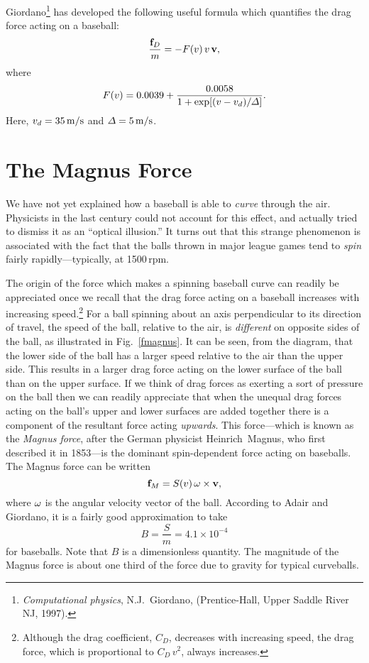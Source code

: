 Giordano\footnote{{\em Computational physics}, N.J.~Giordano, (Prentice-Hall, Upper Saddle River
NJ, 1997).} has developed the following useful formula which quantifies the drag force
acting on a baseball:
\begin{equation}
\frac{{\bf f}_D}{m} = -F(v)\,v\,{\bf v},
\end{equation}
where
\begin{equation}
F(v) = 0.0039 + \frac{0.0058}{1+{\rm exp}[(v-v_d)/{\mit\Delta}]}.
\end{equation}
Here, $v_d = 35\,{\rm m/s}$ and ${\mit\Delta} = 5\,{\rm m/s}$. 


\section{The Magnus Force}
We  have not yet explained how a baseball is able to {\em curve}\/ 
through the air. 
Physicists in the last century could not account for this effect, and actually
tried to dismiss it as an ``optical illusion.''\@
It turns out that this strange phenomenon is
associated with the fact that the balls thrown in major league
games  tend to {\em spin}\/ fairly rapidly---typically, at 1500\,rpm.

The origin of the force which makes a spinning baseball curve can
readily be appreciated once we recall that the drag force acting on a
baseball increases with increasing speed.\footnote{Although the drag
coefficient, $C_D$, decreases with increasing speed,  the drag
force, which is proportional to $C_D\,v^2$, always increases.}
For a ball spinning about an axis perpendicular to its direction of travel, the
speed of the ball, relative to the air, is {\em different}\/ on opposite
sides of the ball, as illustrated in Fig.~\ref{fmagnus}. It can
be seen, from the diagram, that the lower side of the ball has a larger
speed relative to the air than the upper side. This results in a larger drag force
acting on the lower surface of the ball than on the upper surface. If we think of
drag forces as exerting a sort of pressure on the ball then we can readily
appreciate that when the unequal drag forces acting on the ball's upper and lower surfaces
are added together there is a component of the resultant force acting {\em upwards}. This force---which
is known as the {\em Magnus force}, after the German physicist Heinrich~Magnus,
who first described it in 1853---is the dominant spin-dependent force
acting on baseballs. The Magnus force can be written
\begin{equation}\label{emagnus}
{\bf f}_M = S(v)\,{\bf \omega}\times{\bf v},
\end{equation}
where ${\bf \omega}$ is the  angular velocity vector  of the ball. According to
Adair and Giordano, it is a fairly good approximation to take
\begin{equation}
B= \frac{S}{m} = 4.1\times 10^{-4}
\end{equation}
for baseballs. Note that $B$ is a dimensionless quantity. The magnitude
of the Magnus force is about one third of the force due to gravity for
typical curveballs.

